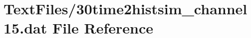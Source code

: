 \hypertarget{30time2histsim__channel15_8dat}{}\section{Text\+Files/30time2histsim\+\_\+channel15.dat File Reference}
\label{30time2histsim__channel15_8dat}
